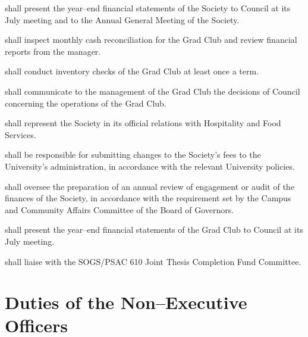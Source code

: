 \begin{longenum}[ label*=\thesubsection.\arabic*., align=left]
    \item shall present the year--end financial statements of the Society to Council at its July meeting and to the Annual General Meeting of the Society.
    \item shall inspect monthly cash reconciliation for the Grad Club and review financial reports from the manager.
    \item shall conduct inventory checks of the Grad Club at least once a term.
    \item shall communicate to the management of the Grad Club the decisions of Council concerning the operations of the Grad Club.
    \item shall represent the Society in its official relations with Hospitality and Food Services.
    \item shall be responsible for submitting changes to the Society's fees to the University's administration, in accordance with the relevant University policies.
    \item shall oversee the preparation of an annual review of engagement or audit of the finances of the Society, in accordance with the requirement set by the Campus and Community Affairs Committee of the Board of Governors.
    \item shall present the year--end financial statements of the Grad Club to Council at its July meeting. 
    \item shall liaise with the SOGS/PSAC 610 Joint Thesis Completion Fund Committee.
    
\end{longenum}

\newpage

\section{Duties of the Non--Executive Officers}
